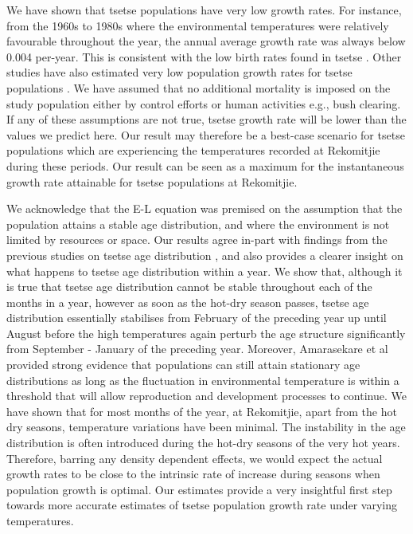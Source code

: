 \documentclass[12pt,a4paper]{article}
\begin{document}
We have shown that tsetse populations have very low growth rates. For instance, from the 1960s to 1980s where the environmental temperatures were relatively favourable throughout the year, the annual average growth rate was always below 0.004 per-year. This is consistent with the low birth rates found in tsetse \cite{Hargrove2004a,HARGROVE1988}. Other studies have also estimated very low population growth rates for tsetse populations \cite{VanSickle1988,Hargrove2004a}. We have assumed that no additional mortality is imposed on the study population either by control efforts or human activities e.g., bush clearing. If any of these assumptions are not true, tsetse growth rate will be lower than the values we predict here. Our result may therefore be a best-case scenario for tsetse populations which are experiencing the temperatures recorded at Rekomitjie during these periods. Our result can be seen as a maximum for the instantaneous growth rate attainable for tsetse populations at Rekomitjie. 

We acknowledge that the E-L equation was premised on the assumption that the population attains a stable age distribution, and where the environment is not limited by resources or space. Our results agree in-part with findings from the previous studies on tsetse age distribution \cite{VanSickle1988,Hargrove2013b,hargrove2015mortality,Ackley2017},  and also provides a clearer insight on what happens to tsetse age distribution within a year. We show that, although it is true that tsetse age distribution cannot be stable throughout each of the months in a year, however as soon as the hot-dry season passes, tsetse age distribution essentially stabilises from February of the preceding year up until August before the high temperatures again perturb the age structure significantly from September - January of the preceding   year. Moreover, Amarasekare et al \cite{Amarasekare2013} provided strong evidence that populations can still attain stationary age distributions as long as the fluctuation in environmental temperature is within a threshold that will allow reproduction and development processes to continue. We have shown that for most months of the year, at Rekomitjie, apart from the hot dry seasons, temperature variations have been minimal. The instability in the age distribution is often introduced during the hot-dry seasons \cite{Hargrove2013b} of the very hot years. Therefore, barring any density dependent effects, we would expect the actual growth rates to be close to the intrinsic rate of increase during seasons when population growth is optimal. Our estimates provide a very insightful first step towards more accurate estimates of tsetse population growth rate under varying temperatures.
\end{document}
